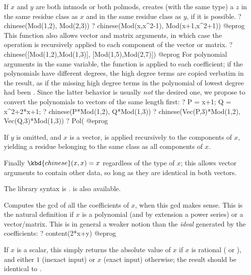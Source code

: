 \label{se:chinese}
If $x$ and $y$ are both intmods or both polmods, creates (with the same
type) a $z$ in the same residue class as $x$ and in the same residue class as
$y$, if it is possible.
\bprog
? chinese(Mod(1,2), Mod(2,3))
? chinese(Mod(x,x^2-1), Mod(x+1,x^2+1))
@eprog\noindent
This function also allows vector and matrix arguments, in which case the
operation is recursively applied to each component of the vector or matrix.
\bprog
? chinese([Mod(1,2),Mod(1,3)], [Mod(1,5),Mod(2,7)])
@eprog\noindent
For polynomial arguments in the same variable, the function is applied to each
coefficient; if the polynomials have different degrees, the high degree terms
are copied verbatim in the result, as if the missing high degree terms in the
polynomial of lowest degree had been . Since the latter
behavior is usually \emph{not} the desired one, we propose to convert the
polynomials to vectors of the same length first:
\bprog
 ? P = x+1; Q = x^2+2*x+1;
 ? chinese(P*Mod(1,2), Q*Mod(1,3))
 ? chinese(Vec(P,3)*Mod(1,2), Vec(Q,3)*Mod(1,3))
 ? Pol(%
@eprog

If $y$ is omitted, and $x$ is a vector,  is applied recursively
to the components of $x$, yielding a residue belonging to the same class as all
components of $x$.

Finally $\kbd{chinese}(x,x) = x$ regardless of the type of $x$; this allows
vector arguments to contain other data, so long as they are identical in both
vectors.

The library syntax is .
 is also available.

\label{se:content}
Computes the gcd of all the coefficients of $x$,
when this gcd makes sense. This is the natural definition
if $x$ is a polynomial (and by extension a power series) or a
vector/matrix. This is in general a weaker notion than the \emph{ideal}
generated by the coefficients:
\bprog
? content(2*x+y)
@eprog

If $x$ is a scalar, this simply returns the absolute value of $x$ if $x$ is
rational ( or ), and either $1$ (inexact input) or $x$
(exact input) otherwise; the result should be identical to .

